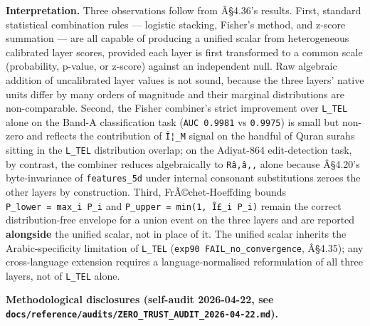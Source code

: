\documentclass[
]{article}
\begin{document}
\textbf{Interpretation.} Three observations follow from Â§4.36's
results. First, standard statistical combination rules --- logistic
stacking, Fisher's method, and z-score summation --- are all capable of
producing a unified scalar from heterogeneous calibrated layer scores,
provided each layer is first transformed to a common scale (probability,
p-value, or z-score) against an independent null. Raw algebraic addition
of uncalibrated layer values is not sound, because the three layers'
native units differ by many orders of magnitude and their marginal
distributions are non-comparable. Second, the Fisher combiner's strict
improvement over \texttt{L\_TEL} alone on the Band-A classification task
(\texttt{AUC\ 0.9981} vs \texttt{0.9975}) is small but non-zero and
reflects the contribution of \texttt{Î¦\_M} signal on the handful of
Quran surahs sitting in the \texttt{L\_TEL} distribution overlap; on the
Adiyat-864 edit-detection task, by contrast, the combiner reduces
algebraically to \texttt{Râ‚â‚‚} alone because Â§4.20's byte-invariance
of \texttt{features\_5d} under internal consonant substitutions zeroes
the other layers by construction. Third, FrÃ©chet-Hoeffding bounds
\texttt{P\_lower\ =\ max\_i\ P\_i} and
\texttt{P\_upper\ =\ min(1,\ Î£\_i\ P\_i)} remain the correct
distribution-free envelope for a union event on the three layers and are
reported \textbf{alongside} the unified scalar, not in place of it. The
unified scalar inherits the Arabic-specificity limitation of
\texttt{L\_TEL} (\texttt{exp90\ FAIL\_no\_convergence}, Â§4.35); any
cross-language extension requires a language-normalised reformulation of
all three layers, not of \texttt{L\_TEL} alone.

\textbf{Methodological disclosures (self-audit 2026-04-22, see
\texttt{docs/reference/audits/ZERO\_TRUST\_AUDIT\_2026-04-22.md}).}
\end{document}
